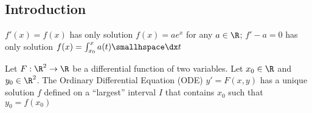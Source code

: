 \subsection{Introduction}
\shortex $f'(x) = f(x)$ has only solution $f(x) = ae^x$ for any $a \in \R$;
$f' - a = 0$ has only solution $f(x) = \int_{x_0}^{x} a(t) \smallhspace \dx t$

\setcounter{all}{6}
\shorttheorem Let $F: \R^2 \rightarrow \R$ be a differential function of two variables. Let $x_0 \in \R$ and $y_0 \in \R^2$.
The Ordinary Differential Equation (ODE) $y' = F(x, y)$ has a unique solution $f$ defined on a ``largest'' interval $I$ that contains $x_0$ such that $y_0 = f(x_0)$
